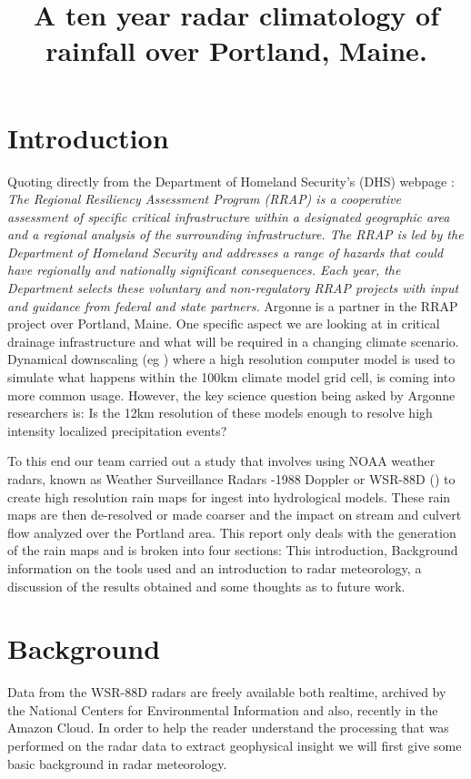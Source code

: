 \documentclass[twocol]{ametsoc}
\title{A ten year radar climatology of rainfall over Portland, Maine.}
\affiliation{Environmental Science Division, Argonne National Laboratory}
\begin{document}
\maketitle


\section{Introduction}
\label{sec:intro}
Quoting directly from the Department of Homeland Security's (DHS) webpage : \textit{The 
Regional Resiliency Assessment Program (RRAP) is a cooperative assessment of specific
 critical infrastructure within a designated geographic area and a regional analysis of the
surrounding infrastructure. The RRAP is led by the Department of Homeland Security
and addresses a range of hazards that could have regionally and nationally significant
 consequences. Each year, the Department selects these voluntary and non-regulatory 
RRAP projects with input and guidance from federal and state partners.} Argonne is a
partner in the RRAP project over Portland, Maine. One specific aspect we are looking
at in critical drainage infrastructure and what will be required in a changing climate
scenario. Dynamical downscaling (eg \cite{wang}) where a high resolution computer
 model is used to simulate what happens within the 100km climate model grid cell, 
 is coming into more common usage. However, the key science question being asked by
  Argonne researchers is: Is the 12km resolution of these models enough to resolve high intensity  
localized precipitation events?

To this end our team carried out a study that involves using NOAA weather radars, known as 
Weather Surveillance Radars -1988 Doppler or WSR-88D (\cite{crum_wsr-88d_1993}) to create high 
resolution rain maps for ingest into hydrological models. These rain maps are then de-resolved or made 
coarser and the impact on stream and culvert flow analyzed over the Portland area. This report only 
deals with the generation of the rain maps and is broken into four sections: This introduction, Background 
information on the tools used and an introduction to radar meteorology, a discussion of the results obtained 
and some thoughts as to future work.  

 
\section{Background}
Data from the WSR-88D radars are freely available both realtime, archived by the National Centers for 
Environmental Information and also, recently in the Amazon Cloud. In order to help the reader understand
the processing that was performed on the radar data to extract geophysical insight we will first give some
basic background in radar meteorology. 
\end{document}
